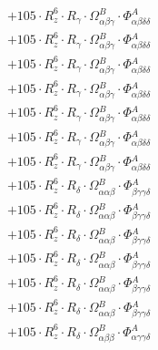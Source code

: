 \documentclass{article}
\begin{document}
\begin{subequations}
\begin{gather}
\begin{array}{c}
 \\[0.2em] 		 + 105 \cdot R_{z}^{6} \cdot R_{\gamma{}} \cdot \Omega{}^{B}_{\alpha{}\beta{}\gamma{}} \cdot \Phi{}^{A}_{\alpha{}\beta{}\delta{}\delta{}} 
 \\[0.2em] 		 + 105 \cdot R_{z}^{6} \cdot R_{\gamma{}} \cdot \Omega{}^{B}_{\alpha{}\beta{}\gamma{}} \cdot \Phi{}^{A}_{\alpha{}\beta{}\delta{}\delta{}} 
 \\[0.2em] 		 + 105 \cdot R_{z}^{6} \cdot R_{\gamma{}} \cdot \Omega{}^{B}_{\alpha{}\beta{}\gamma{}} \cdot \Phi{}^{A}_{\alpha{}\beta{}\delta{}\delta{}} 
 \\[0.2em] 		 + 105 \cdot R_{z}^{6} \cdot R_{\gamma{}} \cdot \Omega{}^{B}_{\alpha{}\beta{}\gamma{}} \cdot \Phi{}^{A}_{\alpha{}\beta{}\delta{}\delta{}} 
 \\[0.2em] 		 + 105 \cdot R_{z}^{6} \cdot R_{\gamma{}} \cdot \Omega{}^{B}_{\alpha{}\beta{}\gamma{}} \cdot \Phi{}^{A}_{\alpha{}\beta{}\delta{}\delta{}} 
 \\[0.2em] 		 + 105 \cdot R_{z}^{6} \cdot R_{\gamma{}} \cdot \Omega{}^{B}_{\alpha{}\beta{}\gamma{}} \cdot \Phi{}^{A}_{\alpha{}\beta{}\delta{}\delta{}} 
 \\[0.2em] 		 + 105 \cdot R_{z}^{6} \cdot R_{\gamma{}} \cdot \Omega{}^{B}_{\alpha{}\beta{}\gamma{}} \cdot \Phi{}^{A}_{\alpha{}\beta{}\delta{}\delta{}} 
 \\[0.2em] 		 + 105 \cdot R_{z}^{6} \cdot R_{\delta{}} \cdot \Omega{}^{B}_{\alpha{}\alpha{}\beta{}} \cdot \Phi{}^{A}_{\beta{}\gamma{}\gamma{}\delta{}} 
 \\[0.2em] 		 + 105 \cdot R_{z}^{6} \cdot R_{\delta{}} \cdot \Omega{}^{B}_{\alpha{}\alpha{}\beta{}} \cdot \Phi{}^{A}_{\beta{}\gamma{}\gamma{}\delta{}} 
 \\[0.2em] 		 + 105 \cdot R_{z}^{6} \cdot R_{\delta{}} \cdot \Omega{}^{B}_{\alpha{}\alpha{}\beta{}} \cdot \Phi{}^{A}_{\beta{}\gamma{}\gamma{}\delta{}} 
 \\[0.2em] 		 + 105 \cdot R_{z}^{6} \cdot R_{\delta{}} \cdot \Omega{}^{B}_{\alpha{}\alpha{}\beta{}} \cdot \Phi{}^{A}_{\beta{}\gamma{}\gamma{}\delta{}} 
 \\[0.2em] 		 + 105 \cdot R_{z}^{6} \cdot R_{\delta{}} \cdot \Omega{}^{B}_{\alpha{}\alpha{}\beta{}} \cdot \Phi{}^{A}_{\beta{}\gamma{}\gamma{}\delta{}} 
 \\[0.2em] 		 + 105 \cdot R_{z}^{6} \cdot R_{\delta{}} \cdot \Omega{}^{B}_{\alpha{}\alpha{}\beta{}} \cdot \Phi{}^{A}_{\beta{}\gamma{}\gamma{}\delta{}} 
 \\[0.2em] 		 + 105 \cdot R_{z}^{6} \cdot R_{\delta{}} \cdot \Omega{}^{B}_{\alpha{}\beta{}\beta{}} \cdot \Phi{}^{A}_{\alpha{}\gamma{}\gamma{}\delta{}} 

\end{array}
\end{gather}
\end{subequations}
\end{document}
